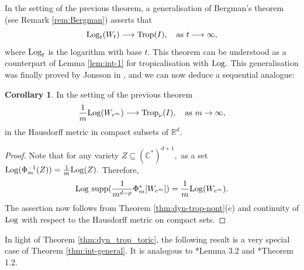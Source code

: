 \documentclass[11pt]{amsart}
\def\Log{{\rm Log}}
\theoremstyle{definition}
\newtheorem{proposition}[theorem]{Proposition}
\newtheorem{corollary}[theorem]{Corollary}
\newcommand{\R}{\mathbb{R}}
\newcommand{\lto}{\longrightarrow}
\newcommand{\C}{\mathbb{C}}
\newcommand{\trop}{\mathrm{trop}}
\newcommand{\cD}{\mathcal{D}}
\newcommand{\sT}{\mathscr{T}}
\newcommand{\Trop}{\mathrm{Trop}}
\newcommand{\supp}[1]{{\mathrm{supp}(#1)}}
\begin{document}
In the setting of the previous theorem, a generalisation of Bergman's theorem (see Remark \ref{rem:Bergman}) asserts that 
$$
\Log_{t} (W_t) \lto \Trop(I), \quad \text{as $t \lto \infty,$}
$$
where $\Log_t$ is the logarithm with base $t.$ This theorem can be understood as a counterpart of Lemma \ref{lem:int-1} for tropicalisation with $\Log.$ This generalisation was finally proved by Jonsson in \cite{Jonsson}, and we can now deduce a sequential analogue: 
\begin{corollary}
  In the setting of the previous theorem 
  $$
  \frac{1}{m} \Log (W_{e^m}) \lto \Trop_{\nu}(I), \quad \text{as $m \to \infty,$}
  $$
  in the Hausdorff metric in compact subsets of $\R^d.$
\end{corollary}
\begin{proof}
Note that for any variety $Z \subseteq (\C^*)^{d+1},$ as a set $\Log (\Phi_m^{-1}(Z)) = \frac{1}{m}\Log(Z).$ Therefore, 
$$
\Log~ \supp{  \frac{1}{m^{d-p}}\Phi_m^* [W_{e^m}]} = \frac{1}{m} {\Log (W_{e^m})}. 
$$
The assertion now follows from Theorem \ref{thm:dyn-trop-nont}(c) and continuity of $\Log$ with respect to the Hausdorff metric on compact sets. 
\end{proof}

In light of Theorem \ref{thm:dyn_trop_toric}, the following result is a very special case of Theorem \ref{thm:int-general}. It is analogous to \cite{BJSST}*{Lemma 3.2} and \cite{Osserman-Payne}*{Theorem 1.2}.
\end{document}
